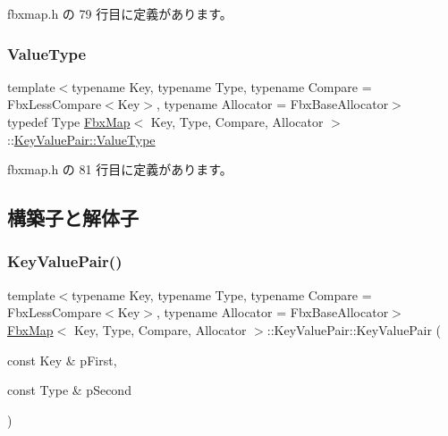  fbxmap.\+h の 79 行目に定義があります。

\mbox{\label{class_fbx_map_1_1_key_value_pair_a716c83c1f6dabf173132b5acde84a9fe}} 
\subsubsection{\texorpdfstring{Value\+Type}{ValueType}}
{\footnotesize\ttfamily template$<$typename Key, typename Type, typename Compare = Fbx\+Less\+Compare$<$\+Key$>$, typename Allocator = Fbx\+Base\+Allocator$>$ \\
typedef Type \hyperlink{class_fbx_map}{Fbx\+Map}$<$ Key, Type, Compare, Allocator $>$\+::\hyperlink{class_fbx_map_1_1_key_value_pair_a716c83c1f6dabf173132b5acde84a9fe}{Key\+Value\+Pair\+::\+Value\+Type}}



 fbxmap.\+h の 81 行目に定義があります。



\subsection{構築子と解体子}
\mbox{\label{class_fbx_map_1_1_key_value_pair_ad6f068ce05b4e108a0218ffaa45c0994}} 
\subsubsection{\texorpdfstring{Key\+Value\+Pair()}{KeyValuePair()}}
{\footnotesize\ttfamily template$<$typename Key, typename Type, typename Compare = Fbx\+Less\+Compare$<$\+Key$>$, typename Allocator = Fbx\+Base\+Allocator$>$ \\
\hyperlink{class_fbx_map}{Fbx\+Map}$<$ Key, Type, Compare, Allocator $>$\+::Key\+Value\+Pair\+::\+Key\+Value\+Pair (\begin{DoxyParamCaption}\item[{const Key \&}]{p\+First,  }\item[{const Type \&}]{p\+Second }\end{DoxyParamCaption})\hspace{0.3cm}{\ttfamily [inline]}}



